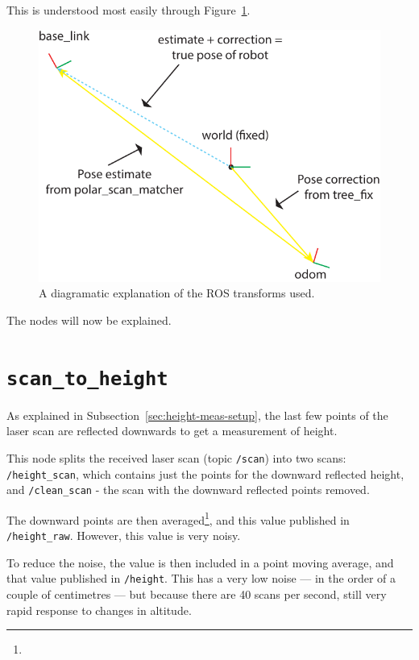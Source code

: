 \documentclass[12pt,oneside,a4paper]{book}
\begin{document}
This is understood most easily through Figure~\ref{fig:rostf}.

\begin{figure}[h!]
  \centering
  \includegraphics[width=\textwidth]{figs/rostf}
  \caption{A diagramatic explanation of the ROS transforms used.}
  \label{fig:rostf}
\end{figure}

The nodes will now be explained.

\section{\texttt{scan\_to\_height}}
\label{sec:scan_to_height}

As explained in Subsection~\ref{sec:height-meas-setup}, the last few
points of the laser scan are reflected downwards to get a measurement
of height.

This node splits the received laser scan (topic \texttt{/scan}) into
two scans: \texttt{/height\_scan}, which contains just the points for
the downward reflected height, and \texttt{/clean\_scan} - the scan
with the downward reflected points removed.

The downward points are then averaged\footnote{}, and this value published in
\texttt{/height\_raw}. However, this value is very noisy. 

To reduce the noise, the value is then included in a   point moving average, and
that value published in \texttt{/height}. This has a very low noise
--- in the order of a couple of centimetres --- but because there are
40 scans per second, still very rapid response to changes in altitude.
\end{document}
